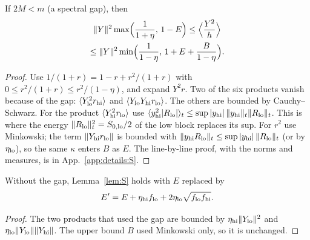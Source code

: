 \begin{lemma}[Lemma S] \proofst
\label{lem:S}
If $2M<m$ (a spectral gap), then
\begin{multline}
\|Y\|^2\max\Bigl(\frac{1}{1+\eta},\,1-E\Bigr)\le\Bigl\langle\frac{Y^2}{h}\Bigr\rangle\\
\le\|Y\|^2\min\Bigl(\frac{1}{1-\eta},\,1+E+\frac{B}{1-\eta}\Bigr).
\end{multline}
\end{lemma}
\begin{proof}
Use $1/(1+r)=1-r+r^2/(1+r)$ with $0\le r^2/(1+r)\le r^2/(1-\eta)$, and expand $Y^2r$.
Two of the six products vanish because of the gap:
$\langle Y_{\rm lo}^2r_{\rm hi}\rangle$ and $\langle Y_{\rm lo}Y_{\rm hi}r_{\rm lo}\rangle$.
The others are bounded by Cauchy--Schwarz.
For the product $\langle Y_{\rm hi}^2r_{\rm lo}\rangle$ use $\langle y_{\rm hi}^2|R_{\rm lo}|\rangle_t\le\sup|y_{\rm hi}|\,\|y_{\rm hi}\|_t\|R_{\rm lo}\|_t$.
This is where the energy $\|R_{\rm lo}\|_t^2=S_{0,\rm lo}/2$ of the low block replaces its sup.
For $r^2$ use Minkowski; the term $\|Y_{\rm hi}r_{\rm lo}\|$ is bounded with $\|y_{\rm hi}R_{\rm lo}\|_t\le\sup|y_{\rm hi}|\,\|R_{\rm lo}\|_t$ (or by $\eta_{\rm lo}$), so the same $\kappa$ enters $B$ as $E$.
The line-by-line proof, with the norms and measures, is in App.~\ref{app:details:S}.
\end{proof}

\begin{lemma} \proofst
\label{lem:Sp}
Without the gap, Lemma~\ref{lem:S} holds with $E$ replaced by
\begin{equation}
E'=E+\eta_{\rm hi}f_{\rm lo}+2\eta_{\rm lo}\sqrt{f_{\rm lo}f_{\rm hi}} .
\end{equation}
\end{lemma}
\begin{proof}
The two products that used the gap are bounded by $\eta_{\rm hi}\|Y_{\rm lo}\|^2$ and $\eta_{\rm lo}\|Y_{\rm lo}\|\|Y_{\rm hi}\|$.
The upper bound $B$ used Minkowski only, so it is unchanged.
\end{proof}


